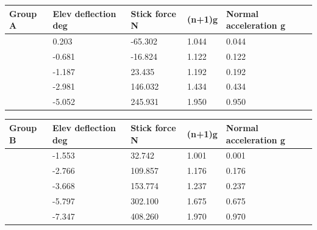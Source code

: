 \documentclass{article}
\begin{document}
\begin{table}[H]
    \centering
    \begin{tabular}{lllll}
        \toprule
        Group A & Elev deflection deg & Stick force N & (n+1)g & Normal acceleration g \\
        \midrule
        & 0.203 & -65.302 & 1.044 & 0.044 \\
        & -0.681 & -16.824 & 1.122 & 0.122 \\
        & -1.187 & 23.435 & 1.192 & 0.192 \\
        & -2.981 & 146.032 & 1.434 & 0.434 \\
        & -5.052 & 245.931 & 1.950 & 0.950 \\
        \bottomrule
        \end{tabular}
\end{table}

\begin{table}[H]
    \centering
        \begin{tabular}{lllll}
        \toprule
        Group B & Elev deflection deg & Stick force N & (n+1)g & Normal acceleration g \\
        \midrule
        & -1.553 & 32.742 & 1.001 & 0.001 \\
        & -2.766 & 109.857 & 1.176 & 0.176 \\
        & -3.668 & 153.774 & 1.237 & 0.237 \\
        & -5.797 & 302.100 & 1.675 & 0.675 \\
        & -7.347 & 408.260 & 1.970 & 0.970 \\
        \bottomrule
        \end{tabular}
\end{table}
\end{document}
